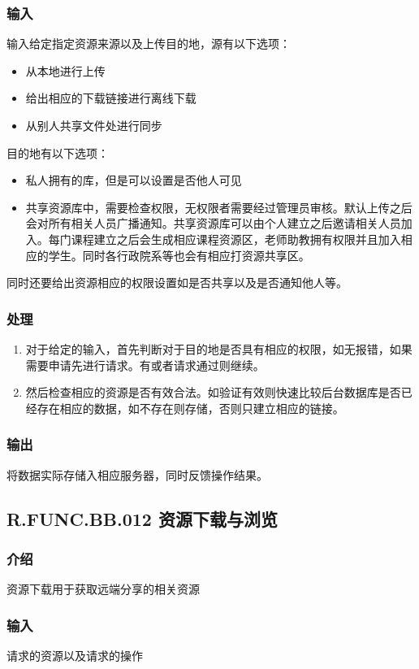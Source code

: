     \subsubsection{输入}
    输入给定指定资源来源以及上传目的地，源有以下选项：
    \begin{itemize}
      \item 从本地进行上传
      \item 给出相应的下载链接进行离线下载
      \item 从别人共享文件处进行同步
    \end{itemize}
    目的地有以下选项：
    \begin{itemize}
      \item 私人拥有的库，但是可以设置是否他人可见
      \item 共享资源库中，需要检查权限，无权限者需要经过管理员审核。默认上传之后会对所有相关人员广播通知。共享资源库可以由个人建立之后邀请相关人员加入。每门课程建立之后会生成相应课程资源区，老师助教拥有权限并且加入相应的学生。同时各行政院系等也会有相应打资源共享区。
    \end{itemize}
    同时还要给出资源相应的权限设置如是否共享以及是否通知他人等。
    \subsubsection{处理}
    \begin{enumerate}
      \item 对于给定的输入，首先判断对于目的地是否具有相应的权限，如无报错，如果需要申请先进行请求。有或者请求通过则继续。
      \item 然后检查相应的资源是否有效合法。如验证有效则快速比较后台数据库是否已经存在相应的数据，如不存在则存储，否则只建立相应的链接。
    \end{enumerate}
    \subsubsection{输出}
    将数据实际存储入相应服务器，同时反馈操作结果。

  \subsection{R.FUNC.BB.012 资源下载与浏览}
    \subsubsection{介绍}
    资源下载用于获取远端分享的相关资源
    \subsubsection{输入}
    请求的资源以及请求的操作
